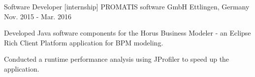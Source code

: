\begin{cventries}
\cventry
{Software Developer [internship]} %
{PROMATIS software GmbH} %
{Ettlingen, Germany} %
{Nov. 2015 - Mar. 2016} %
{
  \begin{cvitems} %
     \item {Developed Java software components for the Horus Business Modeler - an Eclipse Rich Client Platform application for BPM modeling.}
     \item {Conducted a runtime performance analysis using JProfiler to speed up the application.}
  \end{cvitems}
}



\end{cventries}
